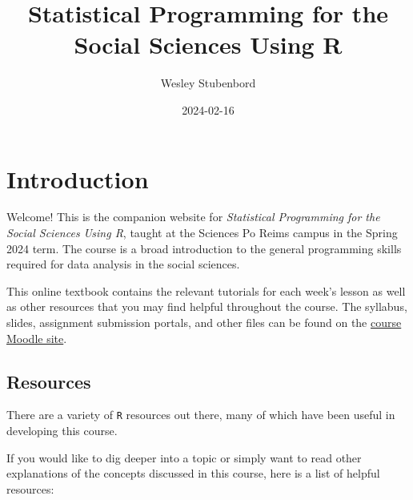 \documentclass[
]{book}
\title{Statistical Programming for the Social Sciences Using R}
\author{Wesley Stubenbord}
\date{2024-02-16}
\begin{document}
\maketitle

{
\setcounter{tocdepth}{1}
\tableofcontents
}
\hypertarget{introduction}{%
\chapter*{Introduction}\label{introduction}}

Welcome! This is the companion website for \emph{Statistical Programming for the Social Sciences Using R}, taught at the Sciences Po Reims campus in the Spring 2024 term. The course is a broad introduction to the general programming skills required for data analysis in the social sciences.

This online textbook contains the relevant tutorials for each week's lesson as well as other resources that you may find helpful throughout the course. The syllabus, slides, assignment submission portals, and other files can be found on the \href{https://moodle.sciences-po.fr/course/view.php?id=40782}{course Moodle site}.

\hypertarget{resources}{%
\section*{Resources}\label{resources}}

There are a variety of \texttt{R} resources out there, many of which have been useful in developing this course.

If you would like to dig deeper into a topic or simply want to read other explanations of the concepts discussed in this course, here is a list of helpful resources:
\end{document}
